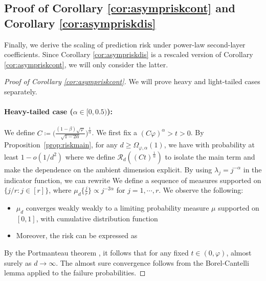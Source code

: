 \subsection{Proof of Corollary \ref{cor:asympriskcont} and Corollary \ref{cor:asympriskdis}}

\label{app:scaling-proof}



Finally, we derive the scaling of prediction risk under power-law second-layer coefficients.  Since Corollary \ref{cor:asympriskdis} is a rescaled version of Corollary \ref{cor:asympriskcont}, we will only consider the latter. 

\begin{proof}[Proof of   Corollary \ref{cor:asympriskcont}]
We will prove heavy   and light-tailed cases  separately. 
\paragraph{Heavy-tailed case ($\alpha \in [0,0.5)$):}   
We define $C \coloneqq \Big( \frac{  (1 - \beta) \sqrt{\varphi}}{\sqrt{1 - 2 \alpha}} \Big)^{\frac{1}{\alpha}}$. We first fix a $(C \varphi)^{\alpha} > t > 0$. By Proposition~\ref{prop:riskmain}, for any  $d \geq \Omega_{\varphi, \alpha}(1)$, we have with probability at least $1 - o(1/d^2)$
where we define $\mathcal{R}_d( (Ct)^{\frac{1}{\alpha}})$ to isolate the main term and make the dependence on the ambient dimension explicit.  By using $\lambda_j = j^{-\alpha}$ in the indicator function, we can rewrite
We define a sequence of measures supported on $\{j/r: j \in [r] \}$, where $\mu_d\{\frac{j}{r}\} \propto j^{-2\alpha}$ for $j = 1, \cdots, r$. We observe the following:
\begin{itemize}
    \item $\mu_d$ converges weakly weakly to a limiting probability measure $\mu$   supported on  $[0,1]$, with cumulative distribution function
    \eq{
    \mu\{ [0, c) \} = \begin{cases}
        c^{1 - 2 \alpha}, & c < 1 \\
        1 & x  \geq 1
    \end{cases}
    }
    \item Moreover, the risk can be expressed as
\end{itemize}
By the Portmanteau theorem \cite{Durrett1993ProbabilityTA}, it follows that for any fixed  $t \in (0,\varphi)$,
almost surely as $d \to \infty$.  The almost sure convergence follows from the Borel-Cantelli lemma \cite{Durrett1993ProbabilityTA} applied to the failure probabilities. 


\end{proof}
